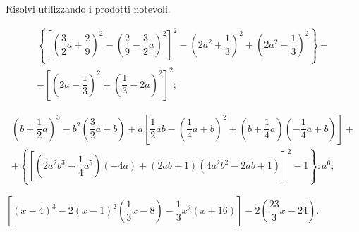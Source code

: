 \begin{esercizio}[\Ast]
 \label{ese:12.39}
Risolvi utilizzando i prodotti notevoli.
 \begin{enumeratea}
 \item \begin{multline*} \left\lbrace\left[\left(\dfrac{3}{2}a+\dfrac{2}{9}\right)^{2}-\left(\dfrac{2}{9}-\dfrac{3}{2}a\right)^{2}\right]^{2}-\left(2a^{2}+\dfrac{1}{3}\right)^{2}+\left(2a^{2}-\dfrac{1}{3}\right)^{2}\right\rbrace+\\-\left[\left(2a-\dfrac{1}{3}\right)^{2}+\left(\dfrac{1}{3}-2a\right)^{2}\right]^{2};\end{multline*}
 \item \begin{multline*} \left(b+\dfrac{1}{2}a\right)^{3}-b^{2}\left(\dfrac{3}{2}a+b\right)+a\left[\dfrac{1}{2}ab-\left(\dfrac{1}{4}a+b\right)^{2}+\left(b+\dfrac{1}{4}a\right)\left(-\dfrac{1}{4}a+b\right)\right]+\\+\left\lbrace\left[\left(2a^{2}b^{3}-\dfrac{1}{4}a^{5}\right)(-4a)+(2ab+1)\left(4a^{2}b^{2}-2ab+1\right)\right]^{2}-1\right\rbrace:a^{6};\end{multline*}
 \item $\left[(x-4)^{3}-2(x-1)^{2}\left(\dfrac{1}{3}x-8\right)-\dfrac{1}{3}x^{2}(x+16)\right]-2\left(\dfrac{23}{3}x-24\right)$.
 \end{enumeratea}
\end{esercizio}

